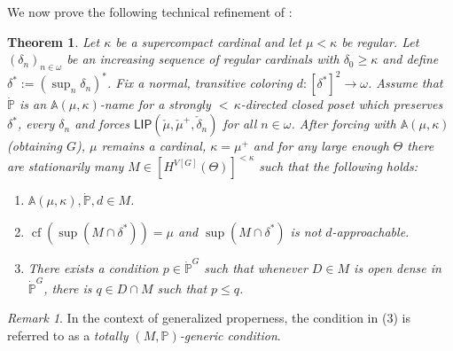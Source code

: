 \documentclass[a4paper]{amsart}
\theoremstyle{definition}
\theoremstyle{remark}
\newtheorem{mybem}[mydef]{Remark}
\theoremstyle{plain}
\newtheorem{mysen}[mydef]{Theorem}
\numberwithin{mydef}{section}
\DeclareMathOperator{\cf}{cf}
\newcommand{\dA}{\mathbb{A}}
\newcommand{\dP}{\mathbb{P}}
\newcommand{\LIP}{\mathsf{LIP}}
\begin{document}
	We now prove the following technical refinement of \cite[Theorem 5.1]{JakobLevineFailureApproachability}:
	
	\begin{mysen}\label{MainThmOneCof}
		Let $\kappa$ be a supercompact cardinal and let $\mu<\kappa$ be regular. Let $(\delta_n)_{n\in\omega}$ be an increasing sequence of regular cardinals with $\delta_0\geq\kappa$ and define $\delta^*:=(\sup_n\delta_n)^*$. Fix a normal, transitive coloring $d\colon[\delta^*]^2\to\omega$. Assume that $\dot{\dP}$ is an $\dA(\mu,\kappa)$-name for a strongly ${<}\,\kappa$-directed closed poset which preserves $\delta^*$, every $\delta_n$ and forces $\LIP(\check{\mu},\check{\mu}^+,\check{\delta}_n)$ for all $n\in\omega$. After forcing with $\dA(\mu,\kappa)$ (obtaining $G$), $\mu$ remains a cardinal, $\kappa=\mu^+$ and for any large enough $\Theta$ there are stationarily many $M\in[H^{V[G]}(\Theta)]^{<\kappa}$ such that the following holds:
		\begin{enumerate}
			\item $\dA(\mu,\kappa),\dot{\dP},d\in M$.
			\item $\cf(\sup(M\cap\delta^*))=\mu$ and $\sup(M\cap\delta^*)$ is not $d$-approachable.
			\item There exists a condition $p\in\dot{\dP}^G$ such that whenever $D\in M$ is open dense in $\dot{\dP}^G$, there is $q\in D\cap M$ such that $p\leq q$.
		\end{enumerate}
	\end{mysen}
	
	\begin{mybem}
		In the context of generalized properness, the condition in (3) is referred to as a \emph{totally $(M,\dP)$-generic condition}.
	\end{mybem}
	
\end{document}
